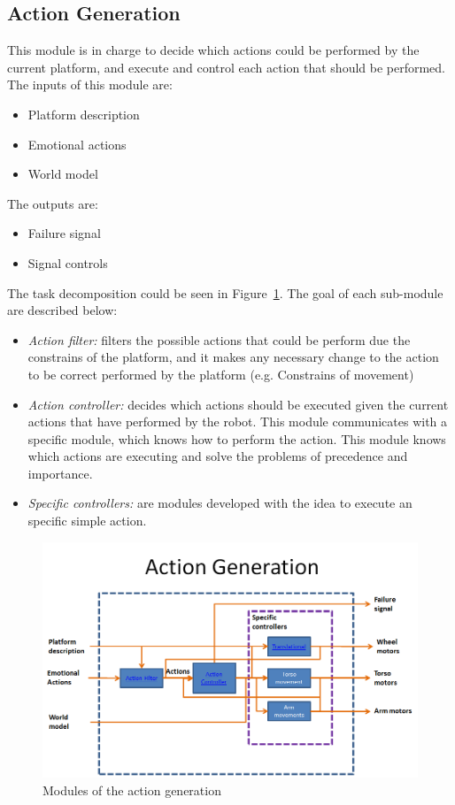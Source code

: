 \subsection{Action Generation}
This module is in charge to decide which actions could be performed by the current platform, and execute and control each action that should be performed. The inputs of this module are:
\begin{itemize}
	\item Platform description
	\item Emotional actions
	\item World model
\end{itemize}
The outputs are:
\begin{itemize}
	\item Failure signal
	\item Signal controls
\end{itemize}
The task decomposition could be seen in Figure~\ref{fig:actionGeneration}. The goal of each sub-module are described below:
\begin{itemize}
	\item \textit{Action filter:} filters the possible actions that could be perform due the constrains of the platform, and it makes any necessary change to the action to be correct performed by the platform (e.g. Constrains of movement)
	\item \textit{Action controller:} decides which actions should be executed given the current actions that have performed by the robot. This module communicates with a specific module, which knows how to perform the action. This module knows which actions are executing and solve the problems of precedence and importance.
	\item \textit{Specific controllers:} are modules developed with the idea to execute an specific simple action.
\end{itemize}
\begin{figure}
	\centering
	\includegraphics[width=1.0\textwidth]{./Images/Architecture/ActionGeneration.png} 
	\caption{Modules of the action generation}
	\label{fig:actionGeneration}
\end{figure}